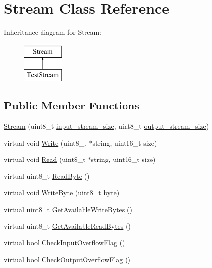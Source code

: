 \hypertarget{class_stream}{\section{Stream Class Reference}
\label{class_stream}
}
Inheritance diagram for Stream\-:\begin{figure}[H]
\begin{center}
\leavevmode
\includegraphics[height=2.000000cm]{class_stream}
\end{center}
\end{figure}
\subsection*{Public Member Functions}
\begin{DoxyCompactItemize}
\item 
\hyperlink{class_stream_a5d29a6cba400ef0d78a6d6e30def93e4}{Stream} (uint8\-\_\-t \hyperlink{class_stream_a8a754b0acc9552d1b78de92b2476f4cb}{input\-\_\-stream\-\_\-size}, uint8\-\_\-t \hyperlink{class_stream_a3a171d646ab70eeb9c034aecb3a72003}{output\-\_\-stream\-\_\-size})
\item 
virtual void \hyperlink{class_stream_a508be3423e4d99ab2757275fb723002a}{Write} (uint8\-\_\-t $\ast$string, uint16\-\_\-t size)
\item 
virtual void \hyperlink{class_stream_a4f3ec0f7a24ddcfd054566feb614afba}{Read} (uint8\-\_\-t $\ast$string, uint16\-\_\-t size)
\item 
virtual uint8\-\_\-t \hyperlink{class_stream_aeb3f1b3d55f4b502c02d73ce4de42714}{Read\-Byte} ()
\item 
virtual void \hyperlink{class_stream_aeaed767b3a8d946c6f81465fa83ff17f}{Write\-Byte} (uint8\-\_\-t byte)
\item 
virtual uint8\-\_\-t \hyperlink{class_stream_a6a16ddb03d3360cef4daf4d38245091d}{Get\-Available\-Write\-Bytes} ()
\item 
virtual uint8\-\_\-t \hyperlink{class_stream_a71cec6c46f3d50cc3ab420e93ae434e1}{Get\-Available\-Read\-Bytes} ()
\item 
virtual bool \hyperlink{class_stream_a088c4e68d568acfad715c56f408fe9f8}{Check\-Input\-Overflow\-Flag} ()
\item 
virtual bool \hyperlink{class_stream_aee6c201819b874c5934a270592d9d311}{Check\-Output\-Overflow\-Flag} ()
\end{DoxyCompactItemize}
